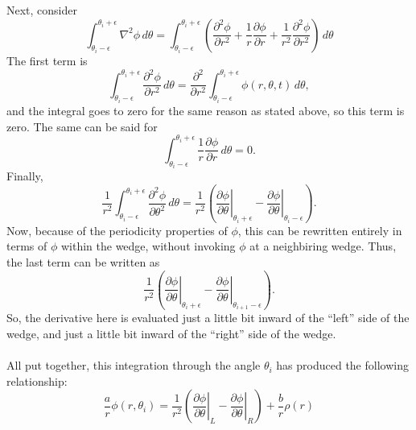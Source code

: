 \documentclass{article}
\begin{document}
Next, consider 
\begin{displaymath}
\int_{\theta_i - \epsilon}^{\theta_i + \epsilon} \nabla^2 \phi  \,d\theta = \int_{\theta_i - \epsilon}^{\theta_i + \epsilon} \left(\frac{\partial^2 \phi}{\partial r^2} + \frac{1}{r} \frac{\partial \phi}{\partial r} + \frac{1}{r^2}\frac{\partial^2 \phi}{\partial r^2} \right) \,d\theta
\end{displaymath}
The first term is 
\begin{displaymath}
\int_{\theta_i - \epsilon}^{\theta_i + \epsilon} \frac{\partial^2 \phi}{\partial r^2} \,d\theta = \frac{\partial^2}{\partial r^2} \int_{\theta_i - \epsilon}^{\theta_i + \epsilon} \phi(r,\theta,t) \,d\theta,
\end{displaymath}
and the integral goes to zero for the same reason as stated above, so this term is zero.  The same can be said for 
\begin{displaymath}
\int_{\theta_i - \epsilon}^{\theta_i + \epsilon} \frac{1}{r}\frac{\partial \phi}{\partial r} \,d\theta = 0.
\end{displaymath}
Finally,
\begin{displaymath}
\frac{1}{r^2} \int_{\theta_i - \epsilon}^{\theta_i + \epsilon} \frac{\partial^2 \phi}{\partial \theta^2} \,d\theta = \frac{1}{r^2}\left(\left. \frac{\partial \phi}{\partial \theta} \right|_{\theta_i + \epsilon} - \left. \frac{\partial \phi}{\partial \theta} \right|_{\theta_i - \epsilon} \right).
\end{displaymath}
Now, because of the periodicity properties of $\phi$, this can be rewritten entirely in terms of $\phi$ within the wedge, without invoking $\phi$ at a neighbiring wedge.  Thus, the last term can be written as 
\begin{displaymath}
 \frac{1}{r^2}\left(\left. \frac{\partial \phi}{\partial \theta} \right|_{\theta_i + \epsilon} - \left. \frac{\partial \phi}{\partial \theta} \right|_{\theta_{i+1} - \epsilon} \right).
\end{displaymath}
So, the derivative here is evaluated just a little bit inward of the ``left'' side of the wedge, and just a little bit inward of the ``right'' side of the wedge.
\\
\\
All put together, this integration through the angle $\theta_i$ has produced the following relationship:
\begin{equation}
\frac{a}{r} \phi(r,\theta_i)= \frac{1}{r^2}\left(\left. \frac{\partial \phi}{\partial \theta} \right|_L - \left. \frac{\partial \phi}{\partial \theta} \right|_R \right) + \frac{b}{r} \rho(r)
\end{equation}
\end{document}
